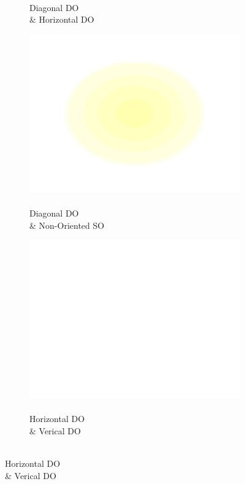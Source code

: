 \documentclass[journal,onecolumn]{IEEEtran}
\begin{document}
\begin{figure}[h]
\begin{subfigure}[b]{0.2\textwidth}
            \caption{\\ Diagonal DO \\ \& Horizontal DO}
    \end{subfigure}%
    \begin{subfigure}[b]{0.2\textwidth}
            \centering
            \captionsetup{justification=centering}
            \includegraphics[width=.85\linewidth]{map-j_2_4}
            \caption{\\ Diagonal DO \\ \& Non-Oriented SO}
    \end{subfigure}%
    \par \bigskip
    \begin{subfigure}[b]{0.2\textwidth}
            \centering
            \captionsetup{justification=centering}
            \includegraphics[width=.85\linewidth]{map-j_blank}
            \caption{\\ Horizontal DO \\ \& Verical DO}

\end{subfigure}
\end{figure}
\end{document}
